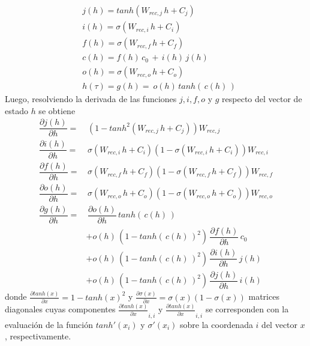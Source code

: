 \documentclass{article}
\begin{document}
\begin{appendices}
		\begin{equation*}
		\begin{split}
		&j(h) = tanh(W_{rec,j} \, h + C_j)\\
		&i(h) = \sigma(W_{rec,i} \, h + C_i)\\
		&f(h) = \sigma(W_{rec,f} \, h + C_f)\\
		&c(h) = f(h) \, c_0 \,+\, i(h) \, j(h)\\
		&o(h) = \sigma(W_{rec,o} \, h + C_o)\\
		&h(\tau) = g(h) = \: o(h) \, tanh( \,c(h)\,)
		\end{split}
		\end{equation*}
		Luego, resolviendo la derivada de las funciones $j, i, f, o$ y $g$ respecto del vector de estado $h$ se obtiene
		\begin{equation*}
		\begin{split}
		\dfrac{\partial j(h)}{\partial h} = & \, (1- tanh^2(W_{rec,j} \, h + C_j))W_{rec,j}\\
		\dfrac{\partial i(h)}{\partial h} = & \, \sigma(W_{rec,i} \, h + C_i) (1-\sigma(W_{rec,i} \, h + C_i)) W_{rec,i}\\
		\dfrac{\partial f(h)}{\partial h} = & \, \sigma(W_{rec,f} \, h + C_f) (1-\sigma(W_{rec,f} \, h + C_f)) W_{rec,f}\\
		\dfrac{\partial o(h)}{\partial h} = & \, \sigma(W_{rec,o} \, h + C_o) (1-\sigma(W_{rec,o} \, h + C_o)) W_{rec,o}\\
		\dfrac{\partial g(h)}{\partial h} = & \, \dfrac{\partial o(h)}{\partial h} \, tanh( \, c(h) \, )\\
		&+ o(h) \, (1 - tanh( \, c(h) \, )^2) \, \dfrac{\partial f(h)}{\partial h} \, c_0\\
		&+ o(h) \, (1 - tanh( \, c(h) \, )^2) \, \dfrac{\partial i(h)}{\partial h} \, j(h)\\
		&+ o(h) \, (1 - tanh( \, c(h) \, )^2) \, \dfrac{\partial j(h)}{\partial h} \, i(h)
		\end{split}
		\end{equation*}
		donde $\frac{\partial tanh(x)}{\partial x} = 1 - tanh(x)^2$ y $\frac{\partial \sigma(x)}{\partial x} = \sigma(x) (1-\sigma(x))$ matrices diagonales cuyas componentes $\frac{\partial tanh(x)}{\partial x}_{i,i}$ y $\frac{\partial tanh(x)}{\partial x}_{i,i}$ se corresponden con la evaluación de la función $tanh'(x_i)$ y $\sigma'(x_i)$ sobre la coordenada $i$ del vector $x$, respectivamente.\\
		

\end{appendices}
\end{document}
